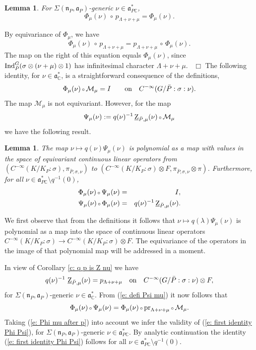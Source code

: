 \documentclass[12pt,a4paper]{article}
\newtheorem{Lemma}[Thm]{Lemma}
\newenvironment{lemma}[0]{\begin{Lemma}\noindent}%
{\end{Lemma}}
\def\proof{\par\noindent{\it Proof.}{\ }{\ }}
\def\qed{~\hfill\hbox{$\Box$}\medbreak}
\def\qquad{\quad\quad}
\def\msy#1{{\mathbb #1}}
\def\C{{\msy C}}
\def\gl{\lambda}
\def\gs{\sigma}
\def\gS{\Sigma}
\def\got#1{\mathfrak #1}
\def\fa{{\got a}}
\def\fn{{\got n}}
\def\to{\rightarrow}
\def\after{\,{\scriptstyle\circ}\,}
\def\pr{{\rm pr}}
\def\iC{{\scriptscriptstyle \C}}
\def\cM{{\mathcal M}}
\numberwithin{Thm}{section}
\numberwithin{equation}{section}
\def\Ind{{\rm Ind}}
\def\fadc{\fa_\C^*}
\def\faPdc{{\fa_{P\iC}^*}}
\def\gL{\Lambda}
\numberwithin{equation}{section}
\def\gL{\Lambda}
\def\faPdc{\fa_{P\iC}^*}
\def\faP{\fa_P}
\def\ulZ{\, \underline{\rm Z}}
\begin{document}
\begin{lemma}
\label{l: Phi after p is Phi}
For $\gS(\fn_P, \faP)$-generic $\nu \in \faPdc$, 
\begin{equation}
\label{e: Phi mu after p}
\Phi_\mu(\nu) \after p_{\gL + \nu +\mu} = \Phi_\mu(\nu) .
\end{equation}
\end{lemma}
\proof
By equivariance of $\Phi_\mu$, we have 
$$
\Phi_\mu(\nu) \after p_{\gL + \nu +\mu} =  p_{\gL + \nu +\mu} \after \Phi_\mu(\nu).
$$ 
The map on the right of this equation equals $\Phi_\mu(\nu)$, 
since $\Ind_{\bar P}^G(\gs \otimes (\nu + \mu) \otimes 1)$ has infinitesimal character $\gL +\nu +\mu.$ 
\qed
The following identity, for $\nu \in \fadc$,  is a straightforward consequence of the definitions,
\begin{equation}
\label{e: identity Phi and M}
\Phi_\mu(\nu)\after \cM_\mu = I \qquad {\rm on} \quad C^{-\infty}(G/\bar P: \gs: \nu).
\end{equation}
The map $\cM_\mu$ is not equivariant. However, for the map 
\begin{equation}
\label{e: defi Psi mu}
\Psi_\mu(\nu):= q(\nu)^{-1} \ulZ_{\bar P, \mu}(\nu) \after \cM_\mu
\end{equation}
we have the following result.
\begin{lemma}
\label{l: inversion Phi mu nu}
The map $\nu \mapsto q(\nu) \Psi_\mu(\nu)$ is polynomial as a map 
with values in the space of equivariant continuous linear operators from  
$(C^{-\infty}(K/K_P:\gs), \pi_{\bar P,\gs,\nu})$  to 
$(C^{-\infty}(K/K_P:\gs)\otimes F, \pi_{\bar P,\gs,\nu} \otimes \pi)$. 
Furthermore, for all $\nu \in \faPdc\setminus q^{-1}(0)$, 
\begin{eqnarray}
\Phi_\mu(\nu) \after \Psi_\mu(\nu) &=&  I,\label{e: first identity Phi Psi}\\
 \Psi_\mu(\nu) \after\Phi_\mu(\nu) & =&  q(\nu)^{-1} \ulZ_{\bar P, \mu}(\nu). \label{e: second identity Phi Psi}
\end{eqnarray}
\end{lemma} 

\proof 
We first observe that from the definitions it follows that $\nu \mapsto q(\gl) \Psi_\mu(\nu)$ is polynomial as a map into the space of continuous linear operators $C^{-\infty}(K/K_P:\gs) \to C^{-\infty}(K/K_P:\gs)\otimes F.$ 
The equivariance of the operators in the image of that polynomial map will be addressed in a moment. 

In view of Corollary \ref{c: q p is Z nu} we have 
\begin{equation}
\label{e: Z equals p}
q(\nu)^{-1} \,\ulZ_{\bar P,\mu}(\nu) = p_{\gL + \nu + \mu} \quad {\rm on} \quad C^{-\infty}(G/\bar P :\gs :\nu) \otimes F,
\end{equation}
for $\gS(\fn_P, \faP)$-generic $\nu \in \fadc.$ From (\ref{e: defi Psi mu}) it now follows that
$$ 
\Phi_\mu(\nu) \after \Psi_\mu(\nu) = \Phi_\mu(\nu) \after \pr_{\gL + \nu + \mu} \after \cM_\mu.
$$ 
Taking (\ref{e: Phi mu after p}) into account we infer the validity of (\ref{e: first identity Phi Psi}), for $\gS(\fn_P, \faP)$-generic $\nu \in \faPdc.$ 
By analytic 
continuation the identity (\ref{e: first identity Phi Psi}) follows for all $\nu \in \faPdc\setminus q^{-1}(0).$
\end{document}

